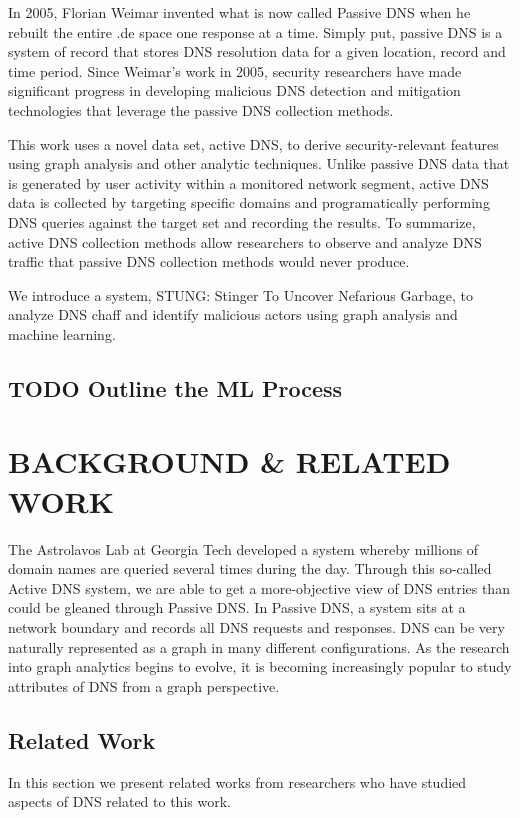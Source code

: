\documentclass{acm_proc_article-sp}
\begin{document}
In 2005, Florian Weimar invented what is now called Passive DNS when he rebuilt the entire .de space one response at a time. Simply put, passive DNS is a system of record that stores DNS resolution data for a given location, record and time period. Since Weimar's work in 2005, security researchers have made significant progress in developing malicious DNS detection and mitigation technologies that leverage the passive DNS collection methods.  

This work uses a novel data set, active DNS, to derive security-relevant features using graph analysis and other analytic techniques. Unlike passive DNS data that is generated by user activity within a monitored network segment, active DNS data is collected by targeting specific domains and programatically performing DNS queries against the target set and recording the results. To summarize, active DNS collection methods allow researchers to observe and analyze DNS traffic that passive DNS collection methods would never produce.  

We introduce a system, STUNG: Stinger To Uncover Nefarious Garbage, to analyze DNS chaff and identify malicious actors using graph analysis and machine learning.

\subsection{TODO Outline the ML Process}

\section{BACKGROUND \& RELATED WORK}
The Astrolavos Lab at Georgia Tech developed a system whereby millions of domain names are queried several times during the day. Through this so-called Active DNS system, we are able to get a more-objective view of DNS entries than could be gleaned through Passive DNS. In Passive DNS, a system sits at a network boundary and records all DNS requests and responses. DNS can be very naturally represented as a graph in many different configurations. As the research into graph analytics begins to evolve, it is becoming increasingly popular to study attributes of DNS from a graph perspective.

\subsection{Related Work}
In this section we present related works from researchers who have studied aspects of DNS related to this work.
\end{document}
